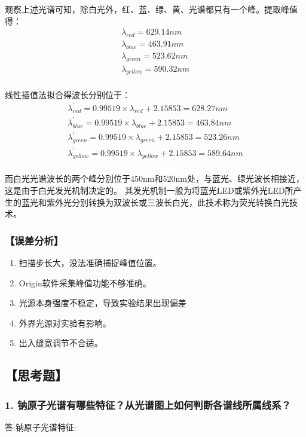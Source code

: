 \documentclass[12pt,a4paper,UTF8]{ctexart}
\begin{document}
观察上述光谱可知，除白光外，红、蓝、绿、黄、光谱都只有一个峰。提取峰值得：
\begin{gather*}
	\lambda_{red}=629.14nm\\
	\lambda_{blue}=463.91nm\\
	\lambda_{green}=523.62nm\\
	\lambda_{yellow}=590.32nm\\
\end{gather*}

线性插值法拟合得波长分别位于：
\begin{gather*}
	\lambda^{'}_{red}=0.99519\times\lambda_{red}+2.15853=628.27nm\\
	\lambda^{'}_{blue}=0.99519\times\lambda_{blue}+2.15853=463.84nm\\
	\lambda^{'}_{green}=0.99519\times\lambda_{green}+2.15853=523.26nm\\
	\lambda^{'}_{yellow}=0.99519\times\lambda_{yellow}+2.15853=589.64nm\\
\end{gather*}

而白光光谱波长的两个峰分别位于450nm和520nm处，与蓝光、绿光波长相接近，这是由于白光发光机制决定的。
其发光机制一般为将蓝光LED或紫外光LED所产生的蓝光和紫外光分别转换为双波长或三波长白光，此技术称为荧光转换白光技术。


\subsubsection*{【误差分析】}
\begin{enumerate}
	\item 扫描步长大，没法准确捕捉峰值位置。
	\item Origin软件采集峰值功能不够准确。
	\item 光源本身强度不稳定，导致实验结果出现偏差
	\item 外界光源对实验有影响。
	\item 出入缝宽调节不合适。
\end{enumerate}






\newpage
\subsection*{【思考题】}
\subsubsection*{1. 钠原子光谱有哪些特征？从光谱图上如何判断各谱线所属线系？}
答:钠原子光谱特征:
\end{document}

